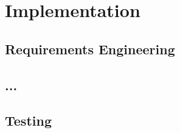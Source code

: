 \newpage
\section{Implementation}
\subsection{Requirements Engineering}
\subsection{...}
\subsection{Testing}
